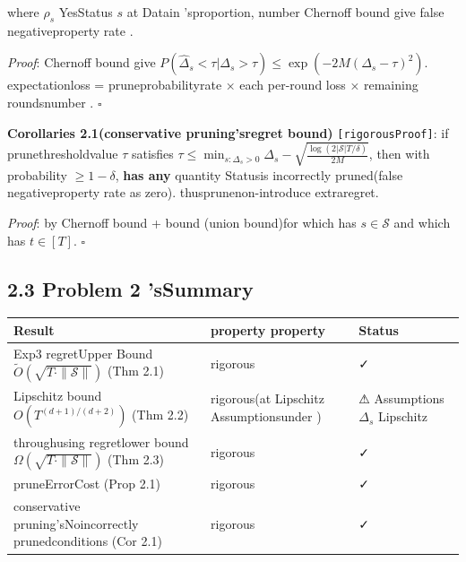 \documentclass[
  12pt,
]{article}
\begin{document}
where \(\rho_s\) YesStatus \(s\) at Datain 'sproportion, number  Chernoff bound
give false negativeproperty rate . 

\emph{Proof}: Chernoff bound give 
\(P(\hat{\Delta}_s < \tau | \Delta_s > \tau) \leq \exp(-2M(\Delta_s - \tau)^2)\). expectationloss
= pruneprobabilityrate  × each per-round loss × remaining roundsnumber . \(\square\)

\textbf{Corollaries 2.1(conservative pruning'sregret bound)}
\texttt{{[}rigorousProof{]}}: if prunethresholdvalue  \(\tau\) satisfies 
\(\tau \leq \min_{s: \Delta_s > 0} \Delta_s - \sqrt{\frac{\log(2|\mathcal{S}|T/\delta)}{2M}}\), then with probability
\(\geq 1-\delta\), \textbf{has any }quantity Statusis incorrectly pruned(false negativeproperty rate as zero). thusprunenon-introduce extraregret. 

\emph{Proof}: by  Chernoff bound + bound (union bound)for which has 
\(s \in \mathcal{S}\) and which has  \(t \in [T]\). \(\square\)

\subsection{2.3 Problem 2 'sSummary}\label{ux95eeux9898-2-ux7684ux603bux7ed3}

\begin{longtable}[]{@{}
  >{\raggedright\arraybackslash}p{}
  >{\raggedright\arraybackslash}p{}
  >{\raggedright\arraybackslash}p{}@{}}
\toprule\noalign{}
\begin{minipage}[b]{\linewidth}\raggedright
Result
\end{minipage} & \begin{minipage}[b]{\linewidth}\raggedright
property property
\end{minipage} & \begin{minipage}[b]{\linewidth}\raggedright
Status
\end{minipage} \\
\midrule\noalign{}
\endhead
\bottomrule\noalign{}
\endlastfoot
Exp3 regretUpper Bound \(\tilde{O}(\sqrt{T \cdot \|\mathcal{S}\|})\) (Thm 2.1) &
rigorous & ✓ \\
Lipschitz bound  \(O(T^{(d+1)/(d+2)})\) (Thm 2.2) & rigorous(at  Lipschitz
Assumptionsunder ) & ⚠ Assumptions \(\Delta_s\) Lipschitz \\
throughusing regretlower bound \(\Omega(\sqrt{T \cdot \|\mathcal{S}\|})\) (Thm 2.3) & rigorous
& ✓ \\
pruneErrorCost (Prop 2.1) & rigorous & ✓ \\
conservative pruning'sNoincorrectly prunedconditions (Cor 2.1) & rigorous & ✓ \\
\end{longtable}
\end{document}
